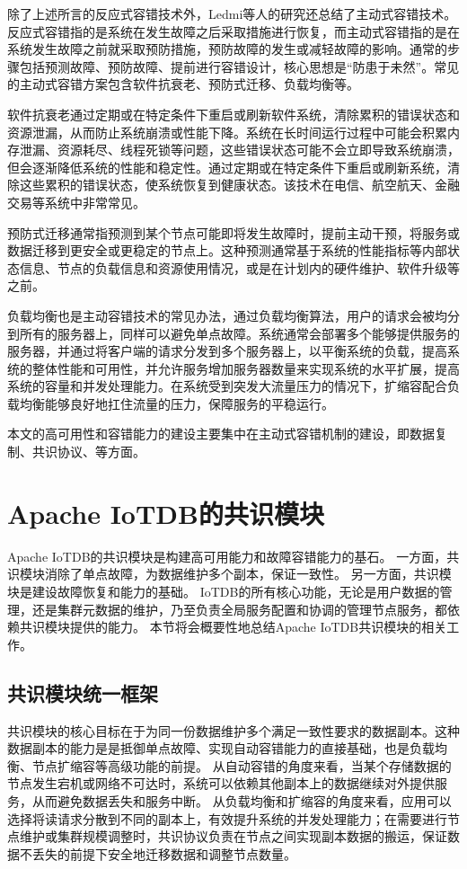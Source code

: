 除了上述所言的反应式容错技术外，Ledmi\cite{ledmi2018fault}等人的研究还总结了主动式容错技术。
反应式容错指的是系统在发生故障之后采取措施进行恢复，而主动式容错指的是在系统发生故障之前就采取预防措施，预防故障的发生或减轻故障的影响。通常的步骤包括预测故障、预防故障、提前进行容错设计，核心思想是“防患于未然”。常见的主动式容错方案包含软件抗衰老、预防式迁移、负载均衡等。

软件抗衰老通过定期或在特定条件下重启或刷新软件系统，清除累积的错误状态和资源泄漏，从而防止系统崩溃或性能下降。系统在长时间运行过程中可能会积累内存泄漏、资源耗尽、线程死锁等问题，这些错误状态可能不会立即导致系统崩溃，但会逐渐降低系统的性能和稳定性。通过定期或在特定条件下重启或刷新系统，清除这些累积的错误状态，使系统恢复到健康状态。该技术在电信、航空航天、金融交易等系统中非常常见。

预防式迁移通常指预测到某个节点可能即将发生故障时，提前主动干预，将服务或数据迁移到更安全或更稳定的节点上。这种预测通常基于系统的性能指标等内部状态信息、节点的负载信息和资源使用情况，或是在计划内的硬件维护、软件升级等之前。

负载均衡也是主动容错技术的常见办法，通过负载均衡算法，用户的请求会被均分到所有的服务器上，同样可以避免单点故障。系统通常会部署多个能够提供服务的服务器，并通过将客户端的请求分发到多个服务器上，以平衡系统的负载，提高系统的整体性能和可用性，并允许服务增加服务器数量来实现系统的水平扩展，提高系统的容量和并发处理能力。在系统受到突发大流量压力的情况下，扩缩容配合负载均衡能够良好地扛住流量的压力，保障服务的平稳运行。

本文的高可用性和容错能力的建设主要集中在主动式容错机制的建设，即数据复制、共识协议、\failover 等方面。

\section{Apache IoTDB的共识模块}

Apache IoTDB的共识模块是构建高可用能力和故障容错能力的基石。
一方面，共识模块消除了单点故障，为数据维护多个副本，保证一致性。
另一方面，共识模块是建设故障恢复和\failover 能力的基础。
IoTDB的所有核心功能，无论是用户数据的管理，还是集群元数据的维护，乃至负责全局服务配置和协调的管理节点服务，都依赖共识模块提供的能力。
本节将会概要性地总结Apache IoTDB共识模块的相关工作。

\subsection{共识模块统一框架}

共识模块的核心目标在于为同一份数据维护多个满足一致性要求的数据副本。这种数据副本的能力是是抵御单点故障、实现自动容错能力的直接基础，也是负载均衡、节点扩缩容等高级功能的前提。
从自动容错的角度来看，当某个存储数据的节点发生宕机或网络不可达时，系统可以依赖其他副本上的数据继续对外提供服务，从而避免数据丢失和服务中断。
从负载均衡和扩缩容的角度来看，应用可以选择将读请求分散到不同的副本上，有效提升系统的并发处理能力；在需要进行节点维护或集群规模调整时，共识协议负责在节点之间实现副本数据的搬运，保证数据不丢失的前提下安全地迁移数据和调整节点数量。

